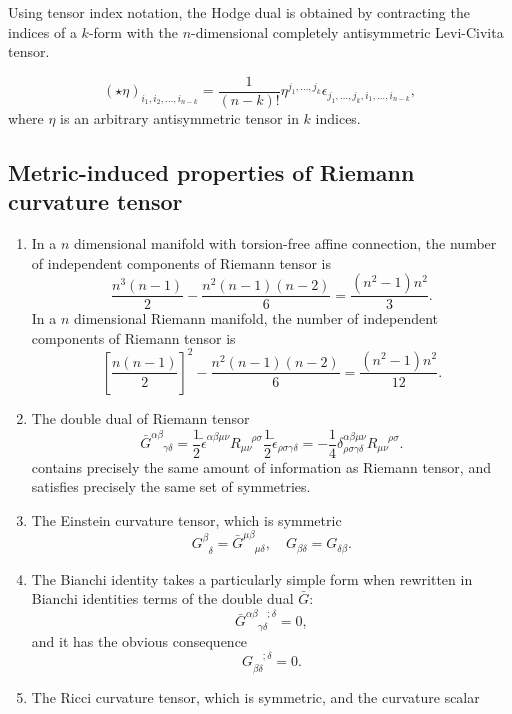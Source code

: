 \noindent
Using tensor index notation, the Hodge dual is obtained by contracting the indices of a $k$-form with the $n$-dimensional completely antisymmetric Levi-Civita tensor.\\

\begin{newprop}
\[(\star \eta )_{i_{1},i_{2},\ldots ,i_{n-k}}={\frac {1}{(n-k)!}}\eta ^{j_{1},\ldots ,j_{k}} \epsilon _{j_{1},\ldots ,j_{k},i_{1},\ldots ,i_{n-k}},\]
where $\eta$ is an arbitrary antisymmetric tensor in $k$ indices. 
\end{newprop}

\subsection{Metric-induced properties of Riemann curvature tensor}
\begin{enumerate}
\item In a $n$ dimensional manifold with torsion-free affine connection, the number of independent components of Riemann tensor is \[\frac{n^3(n-1)}{2} - \frac{n^2(n-1)(n-2)}{6} = \frac{(n^2-1)n^2}{3}.\]
In a $n$ dimensional Riemann manifold,  the number of independent components of Riemann tensor is \[\left[\frac{n(n-1)}{2}\right]^2 -\frac{n^2(n-1)(n-2)}{6} = \frac{(n^2-1)n^2}{12} .\]
\item  The double dual of Riemann tensor
\[\bar{G}^{\alpha \beta}_{\phantom{\alpha \beta} \gamma \delta} = \frac{1}{2} \tilde{\epsilon}^{\alpha \beta \mu \nu} R_{\mu \nu}^{\phantom{\mu \nu} \rho \sigma} \frac{1}{2} \tilde{\epsilon}_{\rho \sigma \gamma \delta} = -\frac{1}{4} \delta^{\alpha \beta \mu \nu}_{\rho \sigma \gamma \delta} R_{\mu \nu}^{\phantom{\mu \nu} \rho \sigma} .\]
contains precisely the same amount of information as
Riemann tensor, and satisfies precisely the same set of symmetries.
\item The Einstein curvature tensor, which is symmetric
\[G^{\beta}_{\phantom{\beta}\delta} = \bar{G}^{\mu \beta}_{\phantom{\mu \beta} \mu \delta} , \quad G_{\beta \delta}=G_{\delta \beta}.\]
\item The Bianchi identity takes a particularly simple form when rewritten in Bianchi identities terms of the double dual $\bar{G}$:
\[\bar{G}^{\alpha \beta \phantom{\gamma \delta};\delta}_{\phantom{\alpha \beta} \gamma \delta} = 0,\]
and it has the obvious consequence
\[G_{\beta \delta}^{\phantom{\beta \delta};\delta} = 0.\]
\item The Ricci curvature tensor, which is symmetric, and the curvature scalar

\end{enumerate}
